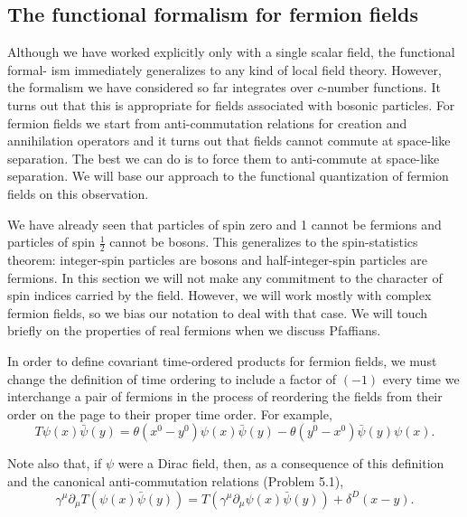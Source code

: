 \subsection{The functional formalism for fermion fields}

Although we have worked explicitly only with a single scalar field, the functional formal-
ism immediately generalizes to any kind of local field theory. However, the formalism
we have considered so far integrates over $c$-number functions. It turns out that this is
appropriate for fields associated with bosonic particles. For fermion fields we start from
anti-commutation relations for creation and annihilation operators and it turns out that
fields cannot commute at space-like separation. The best we can do is to force them
to anti-commute at space-like separation. We will base our approach to the functional
quantization of fermion fields on this observation.

We have already seen that particles of spin zero and 1 cannot be fermions and particles
of spin $\frac12$ cannot be bosons. This generalizes to the spin-statistics theorem: integer-spin
particles are bosons and half-integer-spin particles are fermions. In this section we
will not make any commitment to the character of spin indices carried by the field.
However, we will work mostly with complex fermion fields, so we bias our notation to
deal with that case. We will touch briefly on the properties of real fermions when we
discuss Pfaffians.

In order to define covariant time-ordered products for fermion fields, we must change
the definition of time ordering to include a factor of $(-1)$ every time we interchange a
pair of fermions in the process of reordering the fields from their order on the page to
their proper time order. For example,
\begin{equation*}
  T\psi(x)\bar\psi(y)=\theta(x^0-y^0)\psi(x)\bar\psi(y)
  -\theta(y^0-x^0)\bar\psi(y)\psi(x).
\end{equation*}

Note also that, if $\psi$ were a Dirac field, then, as a consequence of this definition and
the canonical anti-commutation relations (Problem 5.1),
\begin{equation*}
  \gamma^\mu\partial_\mu T(\psi(x)\bar\psi(y))
  =T(\gamma^\mu\partial_\mu\psi(x)\bar\psi(y))+\delta^D(x-y).
\end{equation*}

